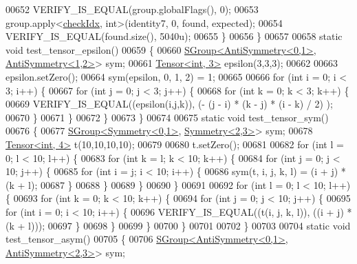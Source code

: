 \begin{DoxyCode}
00652     VERIFY\_IS\_EQUAL(group.globalFlags(), 0);
00653     group.apply<\hyperlink{structcheck_idx}{checkIdx}, \textcolor{keywordtype}{int}>(identity7, 0, found, expected);
00654     VERIFY\_IS\_EQUAL(found.size(), 5040u);
00655   \}
00656 \}
00657 
00658 \textcolor{keyword}{static} \textcolor{keywordtype}{void} test\_tensor\_epsilon()
00659 \{
00660   \hyperlink{class_eigen_1_1_s_group}{SGroup<AntiSymmetry<0,1>}, \hyperlink{struct_eigen_1_1_anti_symmetry}{AntiSymmetry<1,2>}> sym;
00661   \hyperlink{class_eigen_1_1_tensor}{Tensor<int, 3>} epsilon(3,3,3);
00662 
00663   epsilon.setZero();
00664   sym(epsilon, 0, 1, 2) = 1;
00665 
00666   \textcolor{keywordflow}{for} (\textcolor{keywordtype}{int} i = 0; i < 3; i++) \{
00667     \textcolor{keywordflow}{for} (\textcolor{keywordtype}{int} j = 0; j < 3; j++) \{
00668       \textcolor{keywordflow}{for} (\textcolor{keywordtype}{int} k = 0; k < 3; k++) \{
00669         VERIFY\_IS\_EQUAL((epsilon(i,j,k)), (- (j - i) * (k - j) * (i - k) / 2) );
00670       \}
00671     \}
00672   \}
00673 \}
00674 
00675 \textcolor{keyword}{static} \textcolor{keywordtype}{void} test\_tensor\_sym()
00676 \{
00677   \hyperlink{class_eigen_1_1_s_group}{SGroup<Symmetry<0,1>}, \hyperlink{struct_eigen_1_1_symmetry}{Symmetry<2,3>}> sym;
00678   \hyperlink{class_eigen_1_1_tensor}{Tensor<int, 4>} t(10,10,10,10);
00679 
00680   t.setZero();
00681 
00682   \textcolor{keywordflow}{for} (\textcolor{keywordtype}{int} l = 0; l < 10; l++) \{
00683     \textcolor{keywordflow}{for} (\textcolor{keywordtype}{int} k = l; k < 10; k++) \{
00684       \textcolor{keywordflow}{for} (\textcolor{keywordtype}{int} j = 0; j < 10; j++) \{
00685         \textcolor{keywordflow}{for} (\textcolor{keywordtype}{int} i = j; i < 10; i++) \{
00686           sym(t, i, j, k, l) = (i + j) * (k + l);
00687         \}
00688       \}
00689     \}
00690   \}
00691 
00692   \textcolor{keywordflow}{for} (\textcolor{keywordtype}{int} l = 0; l < 10; l++) \{
00693     \textcolor{keywordflow}{for} (\textcolor{keywordtype}{int} k = 0; k < 10; k++) \{
00694       \textcolor{keywordflow}{for} (\textcolor{keywordtype}{int} j = 0; j < 10; j++) \{
00695         \textcolor{keywordflow}{for} (\textcolor{keywordtype}{int} i = 0; i < 10; i++) \{
00696           VERIFY\_IS\_EQUAL((t(i, j, k, l)), ((i + j) * (k + l)));
00697         \}
00698       \}
00699     \}
00700   \}
00701 
00702 \}
00703 
00704 \textcolor{keyword}{static} \textcolor{keywordtype}{void} test\_tensor\_asym()
00705 \{
00706   \hyperlink{class_eigen_1_1_s_group}{SGroup<AntiSymmetry<0,1>}, \hyperlink{struct_eigen_1_1_anti_symmetry}{AntiSymmetry<2,3>}> sym;

\end{DoxyCode}

